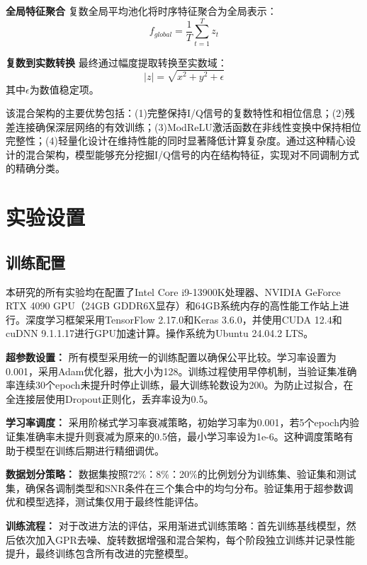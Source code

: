 \documentclass[conference]{IEEEtran}
\begin{document}
\textbf{全局特征聚合} 复数全局平均池化将时序特征聚合为全局表示：
\begin{equation}
f_{global} = \frac{1}{T} \sum_{t=1}^T z_t
\end{equation}

\textbf{复数到实数转换} 最终通过幅度提取转换至实数域：
\begin{equation}
|z|
= \sqrt{x^2 + y^2 + \epsilon}
\end{equation}
其中$\epsilon$为数值稳定项。

该混合架构的主要优势包括：(1)完整保持I/Q信号的复数特性和相位信息；(2)残差连接确保深层网络的有效训练；(3)ModReLU激活函数在非线性变换中保持相位完整性；(4)轻量化设计在维持性能的同时显著降低计算复杂度。通过这种精心设计的混合架构，模型能够充分挖掘I/Q信号的内在结构特征，实现对不同调制方式的精确分类。

\section{实验设置}

\subsection{训练配置}

本研究的所有实验均在配置了Intel Core i9-13900K处理器、NVIDIA GeForce RTX 4090 GPU（24GB GDDR6X显存）和64GB系统内存的高性能工作站上进行。深度学习框架采用TensorFlow 2.17.0和Keras 3.6.0，并使用CUDA 12.4和cuDNN 9.1.1.17进行GPU加速计算。操作系统为Ubuntu 24.04.2 LTS。

\textbf{超参数设置：}
所有模型采用统一的训练配置以确保公平比较。学习率设置为0.001，采用Adam优化器，批大小为128。训练过程使用早停机制，当验证集准确率连续30个epoch未提升时停止训练，最大训练轮数设为200。为防止过拟合，在全连接层使用Dropout正则化，丢弃率设为0.5。

\textbf{学习率调度：}
采用阶梯式学习率衰减策略，初始学习率为0.001，若5个epoch内验证集准确率未提升则衰减为原来的0.5倍，最小学习率设为1e-6。这种调度策略有助于模型在训练后期进行精细调优。

\textbf{数据划分策略：}
数据集按照72\%：8\%：20\%的比例划分为训练集、验证集和测试集，确保各调制类型和SNR条件在三个集合中的均匀分布。验证集用于超参数调优和模型选择，测试集仅用于最终性能评估。

\textbf{训练流程：}
对于改进方法的评估，采用渐进式训练策略：首先训练基线模型，然后依次加入GPR去噪、旋转数据增强和混合架构，每个阶段独立训练并记录性能提升，最终训练包含所有改进的完整模型。
\end{document}
